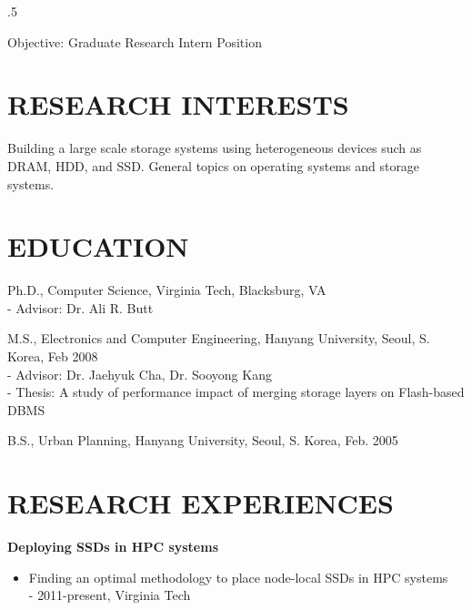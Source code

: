 \documentclass{res}
\begin{document}
 
\thispagestyle{empty} %
\address{Dept. of Computer Science, Virginia Tech\\
2202 Kraft Drive\\
Blackburg, VA 24060\\
(412) 925 - 0322\\
hyogi@vt.edu}


\begin{resume}
\vspace{0.1in}
\moveleft.5\sectionwidth\centerline{Objective: Graduate Research Intern
Position}  

\section{RESEARCH INTERESTS}
\vspace{0.1in}
  Building a large scale storage systems using heterogeneous devices such as
  DRAM, HDD, and SSD.
  General topics on operating systems and storage systems.


\section{EDUCATION}
\vspace{0.1in} 

  Ph.D., Computer Science, Virginia Tech, Blacksburg, VA \\
  - {\small Advisor: Dr. Ali R. Butt}

  M.S., Electronics and Computer Engineering, Hanyang University, Seoul, S. Korea,
  Feb 2008 \\
  - {\small Advisor: Dr. Jaehyuk Cha, Dr. Sooyong Kang}\\
  - {\small Thesis: A study of performance impact of merging storage layers on
  Flash-based DBMS}

  B.S., Urban Planning, Hanyang University, Seoul, S. Korea, Feb. 2005
 
 
\section{RESEARCH EXPERIENCES} 
\vspace{0.1in}
  {\bf Deploying SSDs in HPC systems}
    \begin{itemize}
    \item[] Finding an optimal methodology to place node-local SSDs in HPC
    systems
    \vspace{0.05in}\\
    - {\small 2011-present, Virginia Tech}
    \end{itemize}


\end{resume}
\end{document}
